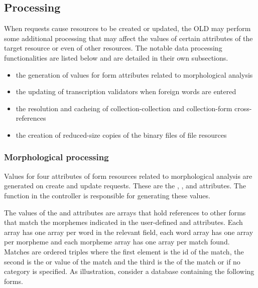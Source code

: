 \documentclass[letterpaper,10pt,english]{sphinxmanual}
\begin{document}
\subsection{Processing}
\label{interface:processing}
When requests cause resources to be created or updated, the OLD may perform some
additional processing that may affect the values of certain attributes of the
target resource or even of other resources.  The notable data processing
functionalities are listed below and are detailed in their own subsections.
\begin{itemize}
\item {} 
the generation of values for form attributes related to morphological analysis

\item {} 
the updating of transcription validators when foreign words are entered

\item {} 
the resolution and cacheing of collection-collection and collection-form cross-references

\item {} 
the creation of reduced-size copies of the binary files of file resources

\end{itemize}


\subsubsection{Morphological processing}
\label{interface:id18}\label{interface:morphological-processing}
Values for four attributes of form resources related to morphological analysis
are generated on create and update requests.  These are the ,
,  and 
attributes.  The function  in the 
controller is responsible for generating these values.

The values of the  and  attributes are
arrays that hold references to other forms that match the morphemes indicated in
the user-defined  and  attributes.  Each array
has one array per word in the relevant field, each word array has one array per
morpheme and each morpheme array has one array per match found.  Matches are
ordered triples where the first element is the id of the match, the second is
the  or  value of the match and the third is
the  of the match or  if no category is
specified.  As illustration, consider a database containing the following forms.
\end{document}
